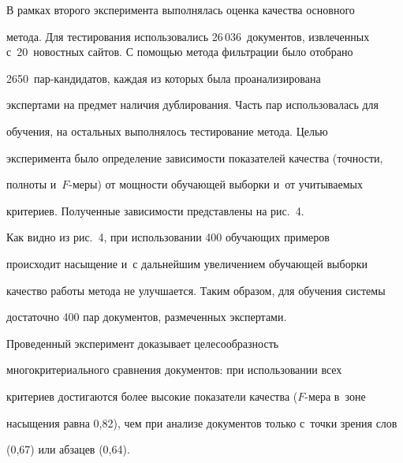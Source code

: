   В рамках второго эксперимента выполнялась оценка качества основного

метода. Для тестирования использовались 26\,036~документов, извлеченных с~20~новостных сайтов. С помощью метода фильтрации было отобрано

2650~пар-кан\-ди\-да\-тов, каждая из которых была проанализирована

экспертами на предмет наличия дублирования. Часть пар использовалась для

обучения, на остальных выполнялось тестирование метода. Целью

эксперимента было определение зависимости показателей качества (точности,

полноты и~$F$-ме\-ры) от мощности обучающей выборки и~от учитываемых

критериев. Полученные зависимости представлены на рис.~4.







  Как видно из рис.~4, при использовании 400 обучающих примеров

происходит насыщение и~с дальнейшим увеличением обучающей выборки

качество работы метода не улучшается. Таким образом, для обучения системы

достаточно 400 пар документов, размеченных экспертами.



  Проведенный эксперимент доказывает целесообразность

многокритериального сравнения документов: при использовании всех

критериев достигаются более высокие показатели качества ($F$-ме\-ра в~зоне

насыщения равна 0,82), чем при анализе документов только с~точки зрения слов

(0,67) или абзацев (0,64).




